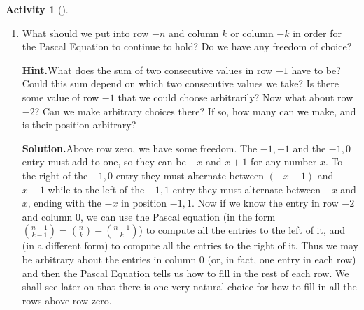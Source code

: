 \documentclass[10pt,]{book}
\theoremstyle{plain}
\theoremstyle{definition}
\newtheorem{activity}[project]{Activity}
\numberwithin{equation}{chapter}
\begin{document}
\begin{activity}[]
\begin{enumerate}[label=(\alph*)]
~\par
\item What should we put into row \(-n\) and column \(k\) or column \(-k\) in order for the Pascal Equation to continue to hold?  Do we have any freedom of choice?%
\par\medskip\noindent%
\textbf{Hint.}\quad What does the sum of two consecutive values in row \(-1\) have to be? Could this sum depend on which two consecutive values we take? Is there some value of row \(-1\) that we could choose arbitrarily? Now what about row \(-2\)?  Can we make arbitrary choices there? If so, how many can we make, and is their position arbitrary?%
\par\medskip\noindent%
\textbf{Solution.}\quad Above row zero, we have some freedom. The \(-1,-1\) and the \(-1,0 \)entry must add to one, so they can be \(-x\) and \(x+1\) for any number \(x\). To the right of the \(-1,0\) entry they must alternate between \((-x-1)\) and \(x+1\) while to the left of the \(-1,1\) entry they must alternate between \(-x\) and \(x\), ending with the \(-x\) in position \(-1,1\). Now if we know the entry in row \(-2\) and column 0, we can use the Pascal equation (in the form \(\binom{n-1}{k-1} = \binom{n}{k} - \binom{n-1}{k}\)) to compute all the entries to the left of it, and (in a different form) to compute all the entries to the right of it. Thus we may be arbitrary about the entries in column 0 (or, in fact, one entry in each row) and then the Pascal Equation tells us how to fill in the rest of each row. We shall see later on that there is one very natural choice for how to fill in all the rows above row zero.%

\end{enumerate}
\end{activity}
\end{document}
